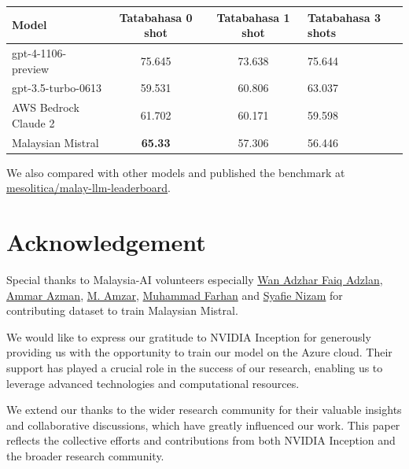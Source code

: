 \documentclass[preprint]{article}
\begin{document}
\begin{table}[h]
  \centering
  \begin{tabular}{lccl}
    \hline
    \textbf{Model}       & \textbf{Tatabahasa 0 shot} & \textbf{Tatabahasa 1 shot} & \textbf{Tatabahasa 3 shots} \\
    \hline
    gpt-4-1106-preview   & 75.645                     & 73.638                     & 75.644                      \\
    gpt-3.5-turbo-0613   & 59.531                     & 60.806                     & 63.037                      \\
    AWS Bedrock Claude 2 & 61.702                     & 60.171                     & 59.598                      \\
    Malaysian Mistral    & \textbf{65.33}             & 57.306                     & 56.446                      \\
    \hline
  \end{tabular}
\end{table}

We also compared with other models and published the benchmark at \href{https://huggingface.co/spaces/mesolitica/malay-llm-leaderboard}{mesolitica/malay-llm-leaderboard}.

\section{Acknowledgement}

Special thanks to Malaysia-AI volunteers especially \href{https://www.linkedin.com/in/wan-adzhar-faiq-adzlan-19a27baa/}{Wan Adzhar Faiq Adzlan}, \href{https://www.linkedin.com/in/ammar-azman/}{Ammar Azman}, \href{https://www.linkedin.com/in/amzar96/}{M. Amzar}, \href{https://www.linkedin.com/in/muhammad-farhan-helmy-0529501a7/}{Muhammad Farhan} and \href{https://www.linkedin.com/in/syafie-nizam/}{Syafie Nizam} for contributing dataset to train Malaysian Mistral.

We would like to express our gratitude to NVIDIA Inception for generously providing us with the opportunity to train our model on the Azure cloud. Their support has played a crucial role in the success of our research, enabling us to leverage advanced technologies and computational resources.

We extend our thanks to the wider research community for their valuable insights and collaborative discussions, which have greatly influenced our work. This paper reflects the collective efforts and contributions from both NVIDIA Inception and the broader research community.
\end{document}
